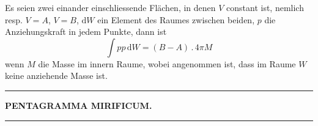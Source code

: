 Es seien zwei einander einschliessende Flächen, in denen $V$ constant ist,
nemlich resp. $V=A$, $V=B$, $\mathrm{d}W$ ein Element des Raumes zwischen beiden,
$p$ die Anziehungskraft in jedem Punkte, dann ist
\[
\int pp\,\mathrm{d}W=(B-A)\, .\,4\pi M
\]
wenn $M$ die Masse im innern Raume, wobei angenommen ist, dass im Raume
$W$ keine anziehende Masse ist.

\par\nopagebreak\begin{center}\rule{93.96bp}{0.35pt}\end{center}

\clearpage{}

\begin{center}
\textbf{PENTAGRAMMA MIRIFICUM.}

\rule{39.96bp}{0.35pt}
\end{center}

\begin{center}
\resizebox{.94\linewidth}{!}{}
\end{center}


